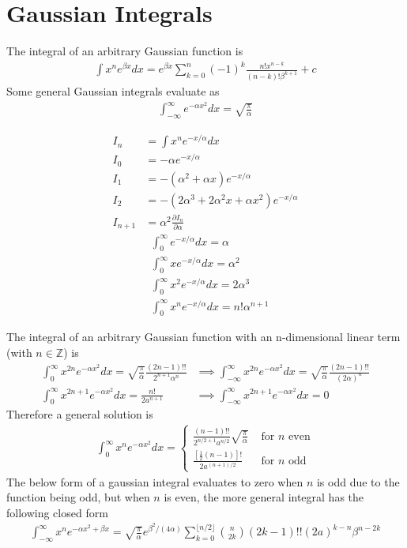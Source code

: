 \section{Gaussian Integrals}
The integral of an arbitrary Gaussian function is
\begin{align}
\int x^ne^{\beta x} dx = e^{\beta x}\sum_{k=0}^{n}(-1)^k\frac{n!x^{n-k}}{(n-k)!\beta^{k+1}}+c
\end{align}
Some general Gaussian integrals evaluate as
\begin{align}
\int_{-\infty}^{\infty} e^{-\alpha x^2} dx = \sqrt{\frac{\pi}{\alpha}} 
\end{align}
\begin{multicols}{2}
	\noindent
\begin{align}
I_n&=\int x^ne^{-x/\alpha}dx \\
I_0&= -\alpha e^{-x/\alpha} \\
I_1&= -(\alpha^2+\alpha x) e^{-x/\alpha} \\
I_2&= -(2\alpha^3+2\alpha^2 x+\alpha x^2) e^{-x/\alpha} \\
I_{n+1}&=\alpha^2\frac{\partial  I_n}{\partial \alpha} 
\end{align}
\begin{align}
&\int_{0}^{\infty}e^{-x/\alpha}dx = \alpha \\
&\int_{0}^{\infty}xe^{-x/\alpha}dx = \alpha^2 \\
&\int_{0}^{\infty}x^2e^{-x/\alpha}dx = 2\alpha^3 \\
&\int_{0}^{\infty}x^ne^{-x/\alpha}dx = n!\alpha^{n+1}
\end{align}
\end{multicols}
The integral of an arbitrary Gaussian function with an n-dimensional linear term (with $n \in \mathbb{Z}$) is
\begin{align}
\int_{0}^{\infty}x^{2n}e^{-\alpha x^2}dx = \sqrt{\frac{\pi}{\alpha}}\frac{(2n-1)!!}{2^{n+1}\alpha^n} &\implies  \int_{-\infty}^{\infty}x^{2n}e^{-\alpha x^2}dx = \sqrt{\frac{\pi}{\alpha}}\frac{(2n-1)!!}{(2\alpha)^n}\\
\int_{0}^{\infty}x^{2n+1}e^{-\alpha x^2}dx = \frac{n!}{2a^{n+1}} &\implies \int_{-\infty}^{\infty}x^{2n+1}e^{-\alpha x^2}dx = 0
\end{align}
Therefore a general solution is
\begin{align}
\int_{0}^{\infty}x^ne^{-\alpha x^2}dx = 
\begin{cases}
\displaystyle
\frac{(n-1)!!}{2^{n/2+1}a^{n/2}}\sqrt{\frac{\pi}{\alpha}} & \textrm{ for $n$ even} \\
\displaystyle
\frac{[\frac{1}{2}(n-1)]!}{2a^{(n+1)/2}}& \textrm{ for $n$ odd} 
\end{cases}
\end{align}
The below form of a gaussian integral evaluates to zero when $n$ is odd due to the function being odd, but when $n$ is even, the more general integral has the following closed form
\begin{align}
\int_{-\infty}^{\infty} x^ne^{-\alpha x^2+\beta x}=\sqrt{\frac{\pi}{\alpha}}e^{\beta^2/(4\alpha)}\sum_{k=0}^{\lfloor n/2\rfloor} {{n}\choose{2k}} (2k-1)!!(2a)^{k-n}\beta^{n-2k}
\end{align}

